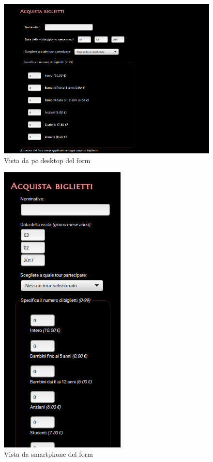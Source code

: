 \documentclass[10pt,a4paper,onecolumn]{article}
\begin{document}
\begin{figure}[h]
\centering
\includegraphics[scale=0.30]{form_desktop.png}
\caption{Vista da pc desktop del form}
\end{figure}
\begin{figure}[h]
\centering
\includegraphics[scale=0.45]{form_mobile.png}
\caption{Vista da smartphone del form}
\end{figure}
\end{document}
